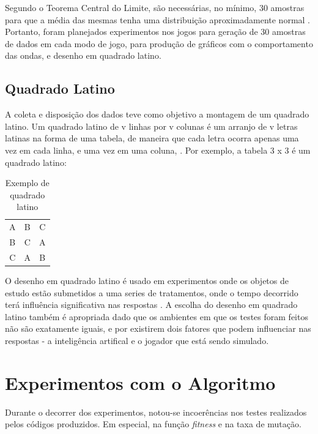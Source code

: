 Segundo o Teorema Central do Limite, são necessárias, no mínimo, 30 amostras para que a média das mesmas tenha uma distribuição aproximadamente normal \citep{Magalhaes_estatistica}. Portanto, foram planejados experimentos nos jogos para geração de 30 amostras de dados em cada modo de jogo, para produção de gráficos com o comportamento das ondas, e desenho em quadrado latino.

\subsection{Quadrado Latino}
\label{sec:t-quad-latino}

A coleta e disposição dos dados teve como objetivo a montagem de um quadrado latino.
Um quadrado latino de v linhas por v colunas é um arranjo de v letras latinas na forma de uma tabela, de maneira que cada letra ocorra apenas uma vez em cada linha, e uma vez em uma coluna, \citep{Design_exp_latin_sq}. Por exemplo, a tabela 3 x 3 é um quadrado latino:

\begin{table}
\caption{Exemplo de quadrado latino}
\begin{tabular}{ccc}
    A       & B    & C     \\ 
    B       & C    & A     \\
    C       & A    & B      \\
\end{tabular}
\end{table}

O desenho em quadrado latino é usado em experimentos onde os objetos de estudo estão submetidos a uma series de tratamentos, onde o tempo decorrido terá influência significativa nas respostas \citep{Design_exp_latin_sq}. A escolha do desenho em quadrado latino também é apropriada dado que os ambientes em que os testes foram feitos não são exatamente iguais, e por existirem dois fatores que podem influenciar nas respostas\citep{campbell:quadradolatino} - a inteligência artifical e o jogador que está sendo simulado.


\section{Experimentos com o Algoritmo}
\label{sec:t-testes-algoritmo}

Durante o decorrer dos experimentos, notou-se incoerências nos testes realizados pelos códigos produzidos. Em especial, na função \textit{fitness} e na taxa de mutação.

